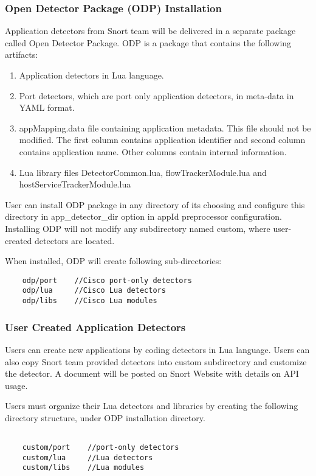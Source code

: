 \documentclass[english]{report}
\begin{document}
\subsubsection{Open Detector Package (ODP) Installation}
Application detectors from Snort team will be delivered in a separate package
called Open Detector Package. ODP is a package that contains the following
artifacts:
\begin{enumerate}

\item Application detectors in Lua language. 

\item Port detectors, which are port only application detectors, in  meta-data in YAML format.

\item appMapping.data file containing application metadata. This file should not
   be modified.  The first column contains application identifier and second column 
   contains application name.  Other columns contain internal information.

\item Lua library files DetectorCommon.lua, flowTrackerModule.lua and
   hostServiceTrackerModule.lua 
\end{enumerate}
User can install ODP package in any directory of its choosing and configure
this directory in app\_detector\_dir option in appId preprocessor configuration.
Installing ODP will not modify any subdirectory named custom, where
user-created detectors are located. 

When installed, ODP will create following sub-directories:
\footnotesize
\begin{verbatim}
    odp/port    //Cisco port-only detectors
    odp/lua     //Cisco Lua detectors
    odp/libs    //Cisco Lua modules
\end{verbatim}
\normalsize

\subsubsection{User Created Application Detectors}

Users can create new applications by coding detectors in Lua language.  Users can also
copy Snort team provided detectors into custom subdirectory and customize the detector. A
document will be posted on Snort Website with details on API usage.

\par \noindent Users must organize their Lua detectors and libraries by creating the following
directory structure, under ODP installation directory.
\footnotesize
\begin{verbatim}

    custom/port    //port-only detectors
    custom/lua     //Lua detectors
    custom/libs    //Lua modules
\end{verbatim}
\normalsize
\end{document}
